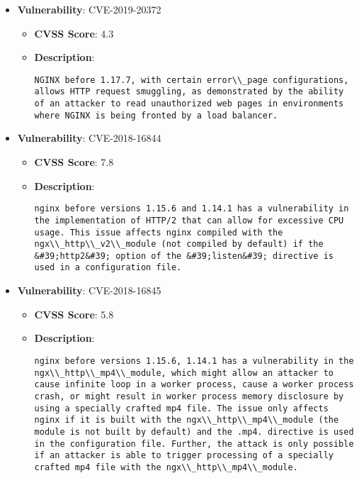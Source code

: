 \documentclass{article}
\begin{document}
\begin{itemize}
        \item \textbf{Vulnerability}: CVE-2019-20372
        \begin{itemize}
            \item \textbf{CVSS Score}:  4.3 
            \item \textbf{Description}:
            \parbox[t]{0.9\linewidth}{
                \verb|NGINX before 1.17.7, with certain error\\_page configurations, allows HTTP request smuggling, as demonstrated by the ability of an attacker to read unauthorized web pages in environments where NGINX is being fronted by a load balancer.|
            }
        \end{itemize}
    
        \item \textbf{Vulnerability}: CVE-2018-16844
        \begin{itemize}
            \item \textbf{CVSS Score}:  7.8 
            \item \textbf{Description}:
            \parbox[t]{0.9\linewidth}{
                \verb|nginx before versions 1.15.6 and 1.14.1 has a vulnerability in the implementation of HTTP/2 that can allow for excessive CPU usage. This issue affects nginx compiled with the ngx\\_http\\_v2\\_module (not compiled by default) if the &#39;http2&#39; option of the &#39;listen&#39; directive is used in a configuration file.|
            }
        \end{itemize}
    
        \item \textbf{Vulnerability}: CVE-2018-16845
        \begin{itemize}
            \item \textbf{CVSS Score}:  5.8 
            \item \textbf{Description}:
            \parbox[t]{0.9\linewidth}{
                \verb|nginx before versions 1.15.6, 1.14.1 has a vulnerability in the ngx\\_http\\_mp4\\_module, which might allow an attacker to cause infinite loop in a worker process, cause a worker process crash, or might result in worker process memory disclosure by using a specially crafted mp4 file. The issue only affects nginx if it is built with the ngx\\_http\\_mp4\\_module (the module is not built by default) and the .mp4. directive is used in the configuration file. Further, the attack is only possible if an attacker is able to trigger processing of a specially crafted mp4 file with the ngx\\_http\\_mp4\\_module.|
            }
        \end{itemize}
    

\end{itemize}
\end{document}
